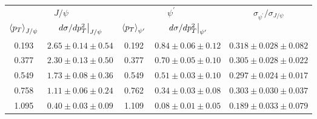 \begin{tabular}{cc|cc|c}
\hline
\multicolumn{2}{c|}{$J/\psi$}                     & \multicolumn{2}{c|}{$\psi^{\prime}$}              & \multirow{2}{*}{$\sigma_{\psi^\prime}/\sigma_{J/\psi}$} \\ \cline{1-4}
$\expval{p_T}_{J/\psi}$ & $\eval{d\sigma/dp^2_T}_{J/\psi}$ & $\expval{p_T}_{\psi^\prime}$ & $\eval{d\sigma/dp^2_T}_{\psi^\prime}$ &  \\ \hline
\multicolumn{1}{c|}{0.193} & $2.65\pm0.14\pm0.54$ & \multicolumn{1}{c|}{0.192} & \multicolumn{1}{c|}{$0.84\pm0.06\pm0.12$} & $0.318\pm0.028\pm0.082$                \\
\multicolumn{1}{c|}{0.377} & $2.30\pm0.13\pm0.50$ & \multicolumn{1}{c|}{0.377} & \multicolumn{1}{c|}{$0.70\pm0.05\pm0.10$} & $0.305\pm0.028\pm0.022$                \\
\multicolumn{1}{c|}{0.549} & $1.73\pm0.08\pm0.36$ & \multicolumn{1}{c|}{0.549} & \multicolumn{1}{c|}{$0.51\pm0.03\pm0.10$} & $0.297\pm0.024\pm0.017$                \\
\multicolumn{1}{c|}{0.758} & $1.11\pm0.06\pm0.24$ & \multicolumn{1}{c|}{0.762} & \multicolumn{1}{c|}{$0.34\pm0.03\pm0.08$} & $0.303\pm0.030\pm0.037$                \\
\multicolumn{1}{c|}{1.095} & $0.40\pm0.03\pm0.09$ & \multicolumn{1}{c|}{1.109} & \multicolumn{1}{c|}{$0.08\pm0.01\pm0.05$} & $0.189\pm0.033\pm0.079$                \\ \hline
\end{tabular}

